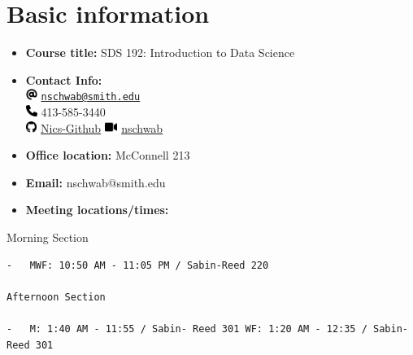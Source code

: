 \documentclass[
  letterpaper,
  DIV=11,
  numbers=noendperiod]{scrartcl}
\author{}
\date{}
\begin{document}
\ifdefined\Shaded\renewenvironment{Shaded}{\begin{tcolorbox}[interior hidden, boxrule=0pt, sharp corners, frame hidden, breakable, borderline west={3pt}{0pt}{shadecolor}, enhanced]}{\end{tcolorbox}}\fi

\hypertarget{basicinfo}{%
\section{Basic information}\label{basicinfo}}

\begin{itemize}
\item
  \textbf{Course title:} SDS 192: Introduction to Data Science
\item
  \textbf{Contact Info:}\\
  \includegraphics[width=1em,height=1em]{syllabus_files/figure-pdf/fa-icon-0472185263d085cbc13489893c2b12dc.pdf}
  \href{mailto:nschwab@smith.edu}{\nolinkurl{nschwab@smith.edu}}\\
  \includegraphics[width=1em,height=1em]{syllabus_files/figure-pdf/fa-icon-b3972e612af455525f0cfa1d7df4456b.pdf}
  413-585-3440\\
  \includegraphics[width=0.97em,height=1em]{syllabus_files/figure-pdf/fa-icon-ac3e0ebe428856e650dbf4ee59e7ca91.pdf}
  \href{http://www.github.com/Nics-Github}{Nics-Github}
  \includegraphics[width=1.12em,height=1em]{syllabus_files/figure-pdf/fa-icon-9642841101846e4ce46f143199382cb4.pdf}
  \href{https://smith.zoom.us/j/8227449694}{nschwab}
\item
  \textbf{Office location:} McConnell 213
\item
  \textbf{Email:} nschwab@smith.edu
\item
  \textbf{Meeting locations/times:}
\end{itemize}

Morning Section

\begin{verbatim}
-   MWF: 10:50 AM - 11:05 PM / Sabin-Reed 220

Afternoon Section

-   M: 1:40 AM - 11:55 / Sabin- Reed 301 WF: 1:20 AM - 12:35 / Sabin- Reed 301
\end{verbatim}
\end{document}
